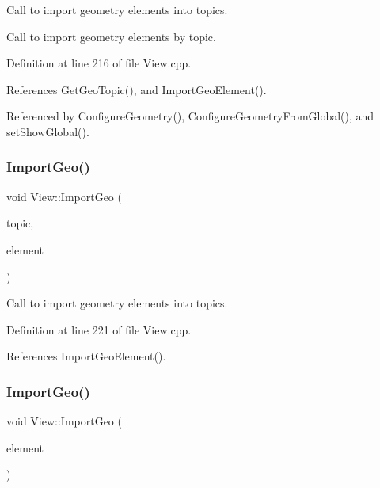 Call to import geometry elements into topics. 

Call to import geometry elements by topic. 

Definition at line 216 of file View.\+cpp.



References Get\+Geo\+Topic(), and Import\+Geo\+Element().



Referenced by Configure\+Geometry(), Configure\+Geometry\+From\+Global(), and set\+Show\+Global().

\hypertarget{class_d_d4hep_1_1_view_a84117a020048c8574aa7186d31f0a0ba}{}\label{class_d_d4hep_1_1_view_a84117a020048c8574aa7186d31f0a0ba} 
\subsubsection{\texorpdfstring{Import\+Geo()}{ImportGeo()}\hspace{0.1cm}{\footnotesize\ttfamily [2/3]}}
{\footnotesize\ttfamily void View\+::\+Import\+Geo (\begin{DoxyParamCaption}\item[{\hyperlink{class_t_eve_element_list}{T\+Eve\+Element\+List} \&}]{topic,  }\item[{T\+Eve\+Element $\ast$}]{element }\end{DoxyParamCaption})\hspace{0.3cm}{\ttfamily [virtual]}}



Call to import geometry elements into topics. 



Definition at line 221 of file View.\+cpp.



References Import\+Geo\+Element().

\hypertarget{class_d_d4hep_1_1_view_aa316fb1bb5375d1e57ba534a510919a7}{}\label{class_d_d4hep_1_1_view_aa316fb1bb5375d1e57ba534a510919a7} 
\subsubsection{\texorpdfstring{Import\+Geo()}{ImportGeo()}\hspace{0.1cm}{\footnotesize\ttfamily [3/3]}}
{\footnotesize\ttfamily void View\+::\+Import\+Geo (\begin{DoxyParamCaption}\item[{T\+Eve\+Element $\ast$}]{element }\end{DoxyParamCaption})\hspace{0.3cm}{\ttfamily [virtual]}}



